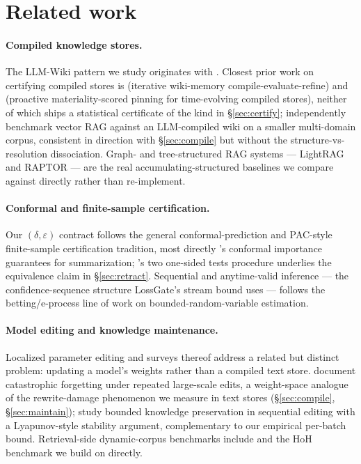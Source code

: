 \section{Related work}
\label{sec:related}

\paragraph{Compiled knowledge stores.} The LLM-Wiki pattern we study originates with \citet{karpathy2026wiki}. Closest prior work on certifying compiled stores is \citet{wicer} (iterative wiki-memory compile-evaluate-refine) and \citet{streaming} (proactive materiality-scored pinning for time-evolving compiled stores), neither of which ships a statistical certificate of the kind in \S\ref{sec:certify}; \citet{cochran2026wikirag} independently benchmark vector RAG against an LLM-compiled wiki on a smaller multi-domain corpus, consistent in direction with \S\ref{sec:compile} but without the structure-vs-resolution dissociation. Graph- and tree-structured RAG systems --- LightRAG \citep{guo2025lightrag} and RAPTOR \citep{sarthi2024raptor} --- are the real accumulating-structured baselines we compare against directly rather than re-implement.

\paragraph{Conformal and finite-sample certification.} Our $(\delta,\varepsilon)$ contract follows the general conformal-prediction and PAC-style finite-sample certification tradition, most directly \citet{conformal}'s conformal importance guarantees for summarization; \citet{schuirmann1987tost}'s two one-sided tests procedure underlies the equivalence claim in \S\ref{sec:retract}. Sequential and anytime-valid inference --- the confidence-sequence structure LossGate's stream bound uses --- follows the betting/e-process line of work on bounded-random-variable estimation.

\paragraph{Model editing and knowledge maintenance.} Localized parameter editing \citep{meng2022rome,meng2023memit} and surveys thereof \citep{yao2023editing} address a related but distinct problem: updating a model's weights rather than a compiled text store. \citet{gupta2024editing} document catastrophic forgetting under repeated large-scale edits, a weight-space analogue of the rewrite-damage phenomenon we measure in text stores (\S\ref{sec:compile}, \S\ref{sec:maintain}); \citet{lyaplock2025} study bounded knowledge preservation in sequential editing with a Lyapunov-style stability argument, complementary to our empirical per-batch bound. Retrieval-side dynamic-corpus benchmarks include \citet{liska2022streamingqa} and the HoH benchmark \citep{ouyang2025hoh} we build on directly.

